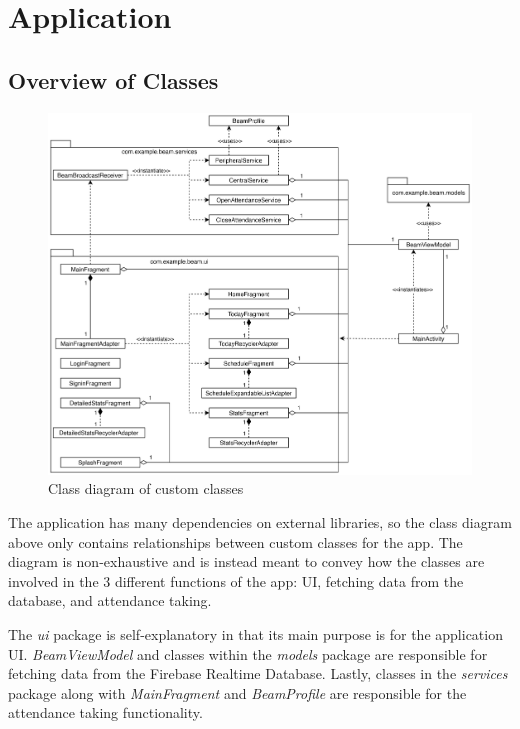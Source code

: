 \documentclass[../report.tex]{subfiles}
\begin{document}
\section{Application}
\subsection{Overview of Classes}
\begin{figure}[H]
	\centering
	\includegraphics[width=.8\linewidth]{../images/07/02-01-class-diagram.png}
	\caption{Class diagram of custom classes}
	\label{fig:07-02-01-class-diagram}
\end{figure}
The application has many dependencies on external libraries, so the class diagram above only contains relationships between custom classes for the app. The diagram is non-exhaustive and is instead meant to convey how the classes are involved in the 3 different functions of the app: UI, fetching data from the database, and attendance taking.

The \textit{ui} package is self-explanatory in that its main purpose is for the application UI. \textit{BeamViewModel} and classes within the \textit{models} package are responsible for fetching data from the Firebase Realtime Database. Lastly, classes in the \textit{services} package along with \textit{MainFragment} and \textit{BeamProfile} are responsible for the attendance taking functionality. 
\end{document}

